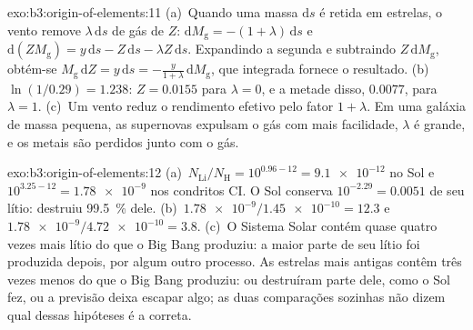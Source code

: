 \begin{solution}{exo:b3:origin-of-elements:11}
(a)~Quando uma massa $\mathrm{d}s$ é retida em estrelas, o vento remove
$\lambda\,\mathrm{d}s$ de gás de  $Z$:
$\mathrm{d}M_\mathrm{g} = -(1 + \lambda)\,\mathrm{d}s$ e
$\mathrm{d}(ZM_\mathrm{g}) = y\,\mathrm{d}s - Z\,\mathrm{d}s -
\lambda Z\,\mathrm{d}s$. Expandindo a segunda e subtraindo
$Z\,\mathrm{d}M_\mathrm{g}$, obtém-se $M_\mathrm{g}\,\mathrm{d}Z =
y\,\mathrm{d}s = -\frac{y}{1 + \lambda}\,\mathrm{d}M_\mathrm{g}$, que
integrada fornece o resultado. (b)~$\ln(1/0.29) = 1.238$: $Z = 0.0155$ para
$\lambda = 0$, e a metade disso, $0.0077$, para $\lambda = 1$. (c)~Um vento
reduz o rendimento efetivo pelo fator $1 + \lambda$. Em uma galáxia de
massa pequena, as supernovas expulsam o gás com mais facilidade, $\lambda$ é grande,
e os metais são perdidos junto com o gás.
\end{solution}

\begin{solution}{exo:b3:origin-of-elements:12}
(a)~$N_\mathrm{Li}/N_\mathrm{H} = 10^{0.96 - 12} = \num{9.1e-12}$ no
Sol e $10^{3.25 - 12} = \num{1.78e-9}$ nos condritos CI. O Sol
conserva $10^{-2.29} = \num{0.0051}$ de seu lítio: destruiu
\qty{99.5}{\percent} dele. (b)~$\num{1.78e-9}/\num{1.45e-10} = 12.3$ e
$\num{1.78e-9}/\num{4.72e-10} = 3.8$. (c)~O Sistema Solar contém quase
quatro vezes mais lítio do que o Big Bang produziu: a maior parte de seu lítio
foi produzida depois, por algum outro processo. As estrelas mais antigas contêm três vezes
menos do que o Big Bang produziu: ou destruíram parte dele, como
o Sol fez, ou a previsão deixa escapar algo; as duas comparações
sozinhas não dizem qual dessas hipóteses é a correta.
\end{solution}

